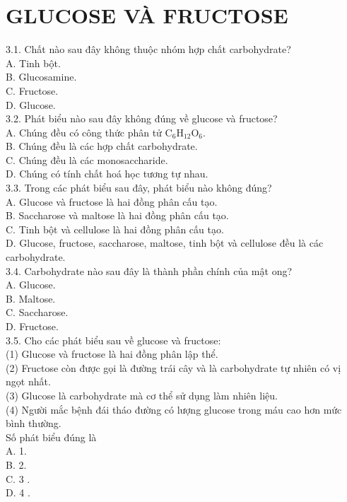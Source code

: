 \documentclass[10pt]{article}
\begin{document}
\section*{GLUCOSE VÀ FRUCTOSE}
3.1. Chất nào sau đây không thuộc nhóm hợp chất carbohydrate?\\
A. Tinh bột.\\
B. Glucosamine.\\
C. Fructose.\\
D. Glucose.\\
3.2. Phát biểu nào sau đây không đúng về glucose và fructose?\\
A. Chúng đều có công thức phân tử $\mathrm{C}_{6} \mathrm{H}_{12} \mathrm{O}_{6}$.\\
B. Chúng đều là các hợp chất carbohydrate.\\
C. Chúng đều là các monosaccharide.\\
D. Chúng có tính chất hoá học tương tự nhau.\\
3.3. Trong các phát biểu sau đây, phát biểu nào không đúng?\\
A. Glucose và fructose là hai đồng phân cấu tạo.\\
B. Saccharose và maltose là hai đồng phân cấu tạo.\\
C. Tinh bột và cellulose là hai đồng phân cấu tạo.\\
D. Glucose, fructose, saccharose, maltose, tinh bột và cellulose đều là các carbohydrate.\\
3.4. Carbohydrate nào sau đây là thành phần chính của mật ong?\\
A. Glucose.\\
B. Maltose.\\
C. Saccharose.\\
D. Fructose.\\
3.5. Cho các phát biểu sau về glucose và fructose:\\
(1) Glucose và fructose là hai đồng phân lập thể.\\
(2) Fructose còn được gọi là đường trái cây và là carbohydrate tự nhiên có vị ngọt nhất.\\
(3) Glucose là carbohydrate mà cơ thể sử dụng làm nhiên liệu.\\
(4) Người mắc bệnh đái tháo đường có lượng glucose trong máu cao hơn mức bình thường.\\
Số phát biểu đúng là\\
A. 1.\\
B. 2.\\
C. 3 .\\
D. 4 .\\
\end{document}
